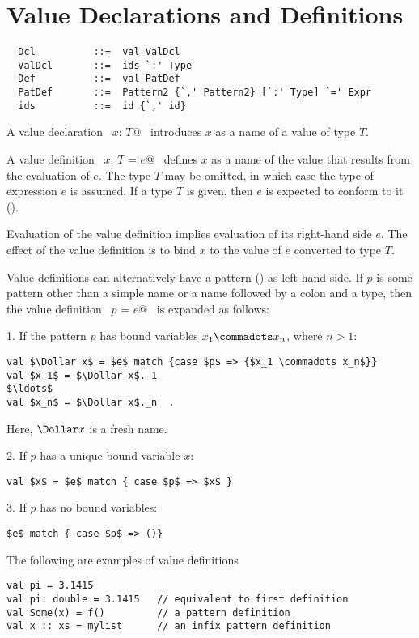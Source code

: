 \section{Value Declarations and Definitions}
\label{sec:valdef}

\syntax\begin{lstlisting}
  Dcl          ::=  val ValDcl
  ValDcl       ::=  ids `:' Type
  Def          ::=  val PatDef 
  PatDef       ::=  Pattern2 {`,' Pattern2} [`:' Type] `=' Expr
  ids          ::=  id {`,' id}
\end{lstlisting}

A value declaration ~\lstinline@val $x$: $T$@~ introduces $x$ as a name of a value of
type $T$.  

A value definition ~\lstinline@val $x$: $T$ = $e$@~ defines $x$ as a
name of the value that results from the evaluation of $e$. The type
$T$ may be omitted, in which case the type of expression $e$ is
assumed.  If a type $T$ is given, then $e$ is expected to conform to
it ().

Evaluation of the value definition implies evaluation of its
right-hand side $e$.  The effect of the value definition is to bind
$x$ to the value of $e$ converted to type $T$.

Value definitions can alternatively have a pattern
() as left-hand side.  If $p$ is some pattern other
than a simple name or a name followed by a colon and a type, then the
value definition ~\lstinline@val $p$ = $e$@~ is expanded as follows:

1. If the pattern $p$ has bound variables $x_1 \commadots x_n$, where $n > 1$:
\begin{lstlisting}
val $\Dollar x$ = $e$ match {case $p$ => {$x_1 \commadots x_n$}}
val $x_1$ = $\Dollar x$._1
$\ldots$
val $x_n$ = $\Dollar x$._n  .
\end{lstlisting}
Here, $\Dollar x$ is a fresh name.  

2. If $p$ has a unique bound variable $x$:
\begin{lstlisting}
val $x$ = $e$ match { case $p$ => $x$ }
\end{lstlisting}

3. If $p$ has no bound variables:
\begin{lstlisting}
$e$ match { case $p$ => ()}
\end{lstlisting}

\example
The following are examples of value definitions
\begin{lstlisting}
val pi = 3.1415 
val pi: double = 3.1415   // equivalent to first definition
val Some(x) = f()         // a pattern definition
val x :: xs = mylist      // an infix pattern definition
\end{lstlisting}

